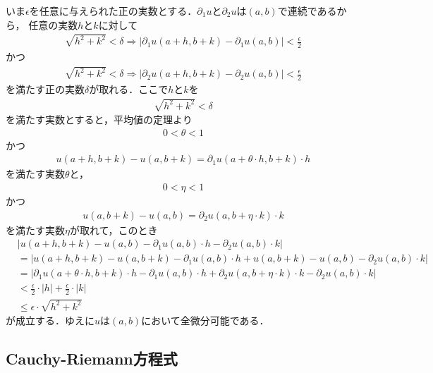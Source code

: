 	\begin{sketch}
		いま$\epsilon$を任意に与えられた正の実数とする．$\partial_1 u$と$\partial_2 u$は$(a,b)$で連続であるから，
		任意の実数$h$と$k$に対して
		\begin{align}
			\sqrt{h^2 + k^2} < \delta \Longrightarrow \left|\partial_1 u(a+h,b+k) - \partial_1 u(a,b)\right| 
			< \frac{\epsilon}{2}
		\end{align}
		かつ
		\begin{align}
			\sqrt{h^2 + k^2} < \delta \Longrightarrow \left|\partial_2 u(a+h,b+k) - \partial_2 u(a,b)\right| 
			< \frac{\epsilon}{2}
		\end{align}
		を満たす正の実数$\delta$が取れる．ここで$h$と$k$を
		\begin{align}
			\sqrt{h^2 + k^2} < \delta
		\end{align}
		を満たす実数とすると，平均値の定理より
		\begin{align}
			0 < \theta < 1
		\end{align}
		かつ
		\begin{align}
			u(a+h,b+k) - u(a,b+k) = \partial_1 u(a+\theta \cdot h,b+k) \cdot h
		\end{align}
		を満たす実数$\theta$と，
		\begin{align}
			0 < \eta < 1
		\end{align}
		かつ
		\begin{align}
			u(a,b+k) - u(a,b) = \partial_2 u(a,b+ \eta \cdot k) \cdot k
		\end{align}
		を満たす実数$\eta$が取れて，このとき
		\begin{align}
			&\left|u(a+h,b+k) - u(a,b) - \partial_1 u(a,b) \cdot h - \partial_2 u(a,b) \cdot k\right| \\
			&= \left|u(a+h,b+k) - u(a,b+k) - \partial_1 u(a,b) \cdot h 
			+ u(a,b+k) - u(a,b) - \partial_2 u(a,b) \cdot k\right| \\
			&= \left|\partial_1 u(a+\theta \cdot h,b+k) \cdot h - \partial_1 u(a,b) \cdot h
			+ \partial_2 u(a,b+ \eta \cdot k) \cdot k - \partial_2 u(a,b) \cdot k\right| \\
			&< \frac{\epsilon}{2} \cdot |h| + \frac{\epsilon}{2} \cdot |k| \\
			&\leq \epsilon \cdot \sqrt{h^2 + k^2}
		\end{align}
		が成立する．ゆえに$u$は$(a,b)$において全微分可能である．
		\QED
	\end{sketch}
	
\subsection{Cauchy-Riemann方程式}
	
